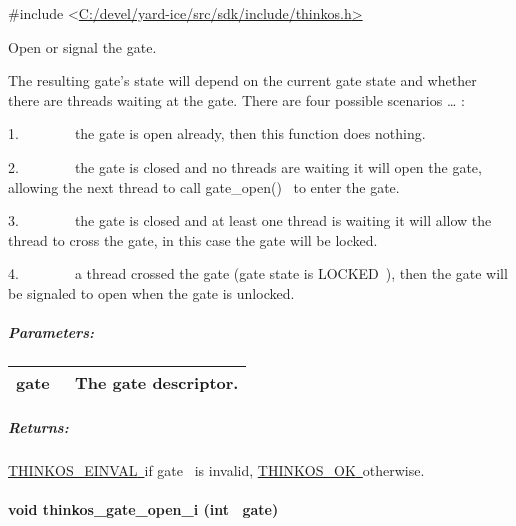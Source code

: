 {{}

{\#include
\textless{}}{\protect\hyperlink{h.pkwqa1}{C:/devel/yard-ice/src/sdk/include/thinkos.h}}{\protect\hyperlink{h.pkwqa1}{\textgreater{}}}

{Open or signal the gate. }

{The resulting gate's state will depend on the current gate state and
whether there are threads waiting at the gate. There are four possible
scenarios \ldots{} :}

{1.~~~~~~~~the gate is open already, then this function does nothing.}

{2.~~~~~~~~the gate is closed and no threads are waiting it will open
the gate, allowing the next thread to call }{gate\_open()}{~ to enter
the gate.}

{3.~~~~~~~~the gate is closed and at least one thread is waiting it will
allow the thread to cross the gate, in this case the gate will be
locked.}

{4.~~~~~~~~a thread crossed the gate (gate state is }{LOCKED}{~), then
the gate will be signaled to open when the gate is unlocked.}

\subparagraph{\texorpdfstring{{Parameters:}}{Parameters:}}\label{parameters-44}

\protect\hypertarget{t.63aac5addc95ec2809d3272ba50ab5f93508edb0}{}{}\protect\hypertarget{t.44}{}{}

\begin{longtable}[]{@{}ll@{}}
\toprule
\begin{minipage}[t]{0.47\columnwidth}\raggedright\strut
{gate}{~}\strut
\end{minipage} & \begin{minipage}[t]{0.47\columnwidth}\raggedright\strut
{The gate descriptor. }\strut
\end{minipage}\tabularnewline
\bottomrule
\end{longtable}

\subparagraph{\texorpdfstring{{Returns:}}{Returns:}}\label{returns-47}

{\protect\hyperlink{h.1tuee74}{THINKOS\_EINVAL}}{\protect\hyperlink{h.1tuee74}{~}}{if
}{gate}{~ is invalid,
}{\protect\hyperlink{h.2fk6b3p}{THINKOS\_OK}}{\protect\hyperlink{h.2fk6b3p}{~}}{otherwise.
}

\paragraph{\texorpdfstring{{void thinkos\_gate\_open\_i (int
~gate)}}{void thinkos\_gate\_open\_i (int ~gate)}}\label{void-thinkos_gate_open_i-int-gate}

}
